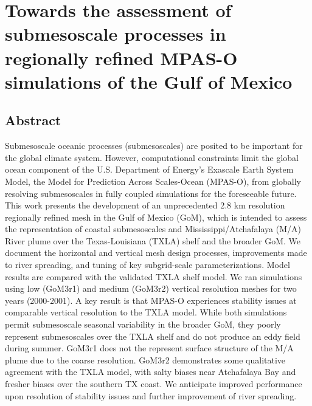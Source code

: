 


\chapter{Towards the assessment of submesoscale processes in regionally refined MPAS-O simulations of the Gulf of Mexico}

\section{Abstract}
Submesoscale oceanic processes (submesoscales) are posited to be important for the global climate system. However, computational constraints limit the global ocean component of the U.S. Department of Energy's Exascale Earth System Model, the Model for Prediction Across Scales-Ocean (MPAS-O), from globally resolving submesoscales in fully coupled simulations for the foreseeable future. This work presents the development of an unprecedented 2.8 km resolution regionally refined mesh in the Gulf of Mexico (GoM), which is intended to assess the representation of coastal submesoscales and Mississippi/Atchafalaya (M/A) River plume over the Texas-Louisiana (TXLA) shelf and the broader GoM. We document the horizontal and vertical mesh design processes, improvements made to river spreading, and tuning of key subgrid-scale parameterizations. Model results are compared with the validated TXLA shelf model. We ran simulations using low (GoM3r1) and medium (GoM3r2) vertical resolution meshes for two years (2000-2001). A key result is that MPAS-O experiences stability issues at comparable vertical resolution to the TXLA model. While both simulations permit submesoscale seasonal variability in the broader GoM, they poorly represent submesoscales over the TXLA shelf and do not produce an eddy field during summer. GoM3r1 does not the represent surface structure of the M/A plume due to the coarse resolution. GoM3r2 demonstrates some qualitative agreement with the TXLA model, with salty biases near Atchafalaya Bay and fresher biases over the southern TX coast. We anticipate improved performance upon resolution of stability issues and further improvement of river spreading.

